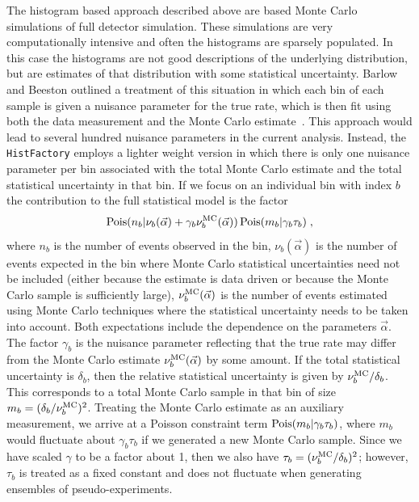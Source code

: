 The histogram based approach described above are based Monte Carlo simulations of full detector simulation.  These simulations are very computationally intensive and often the histograms are sparsely populated.  In this case the histograms are not good descriptions of the underlying distribution, but are estimates of that distribution with some statistical uncertainty.  Barlow and Beeston outlined a treatment of this situation in which each bin of each sample is given a nuisance parameter for the true rate, which is then fit using both the data measurement and the Monte Carlo estimate~\cite{Barlow:1993dm}.  This approach would lead to several hundred nuisance parameters in the current analysis.  Instead, the \texttt{HistFactory} employs a lighter weight version in which there is only one nuisance parameter per bin associated with the total Monte Carlo estimate  and the total statistical uncertainty in that bin.  If we focus on an individual bin with index $b$ the contribution to the full statistical model is the factor
\begin{equation}
{\ensuremath{\rm Pois}}(n_b | \nu_b(\vec\alpha) + \gamma_b \nu_b^{\rm MC}(\vec\alpha)) \,  {\rm Pois}(m_b | \gamma_b \tau_b) \;,
\end{equation}
where $n_b$ is the number of events observed in the bin, $\nu_b(\vec\alpha)$ is the number of events expected in the bin where Monte Carlo statistical uncertainties need not be included (either because the estimate is data driven or because the Monte Carlo sample is sufficiently large), $\nu_b^{\rm MC}(\vec\alpha)$ is the number of events estimated using Monte Carlo techniques where the statistical uncertainty needs to be taken into account.  Both expectations include the dependence on the parameters $\vec\alpha$.  The factor $\gamma_b$ is the nuisance parameter reflecting that the true rate may differ from the Monte Carlo estimate $\nu_b^{\rm MC}(\vec\alpha) $ by some amount.  If the total statistical uncertainty is $\delta_b$, then the relative statistical uncertainty is given by $\nu_b^{\rm MC}/\delta_b$.  This corresponds to a total Monte Carlo sample in that bin of size $m_b =  (\delta_b/\nu_b^{\rm MC})^2$.  Treating the Monte Carlo estimate as an auxiliary measurement, we arrive at a Poisson constraint term $ {\rm Pois}(m_b | \gamma_b \tau_b)$, where $m_b$ would fluctuate about $\gamma_b \tau_b$ if we generated a new Monte Carlo sample.  Since we have scaled $\gamma$ to be a factor about 1, then we also have $\tau_b=(\nu_b^{\rm MC}/\delta_b)^2$; however, $\tau_b$ is treated as a fixed constant and does not fluctuate when generating ensembles of pseudo-experiments.

